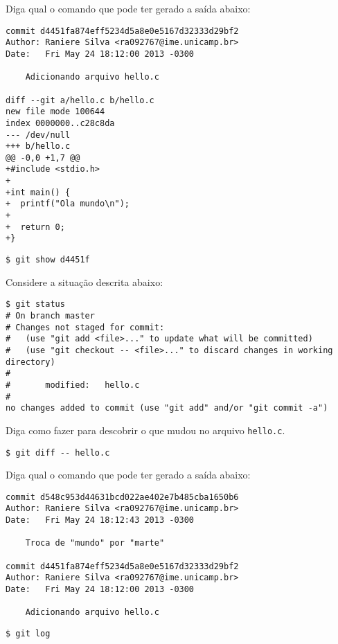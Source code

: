 \begin{Exercise}[label={0011}, difficulty={0}, origin={git}]
  Diga qual o comando que pode ter gerado a saída abaixo:
  \begin{lstlisting}
commit d4451fa874eff5234d5a8e0e5167d32333d29bf2
Author: Raniere Silva <ra092767@ime.unicamp.br>
Date:   Fri May 24 18:12:00 2013 -0300

    Adicionando arquivo hello.c

diff --git a/hello.c b/hello.c
new file mode 100644
index 0000000..c28c8da
--- /dev/null
+++ b/hello.c
@@ -0,0 +1,7 @@
+#include <stdio.h>
+
+int main() {
+  printf("Ola mundo\n");
+
+  return 0;
+}
  \end{lstlisting}
\end{Exercise}
\begin{Answer}[ref={0011}]
  \begin{lstlisting}
$ git show d4451f 
  \end{lstlisting}
\end{Answer}

\begin{Exercise}[label={0012}, difficulty={0}, origin={git}]
  Considere a situação descrita abaixo:
  \begin{lstlisting}
$ git status
# On branch master
# Changes not staged for commit:
#   (use "git add <file>..." to update what will be committed)
#   (use "git checkout -- <file>..." to discard changes in working directory)
#
#       modified:   hello.c
#
no changes added to commit (use "git add" and/or "git commit -a")
  \end{lstlisting}
  Diga como fazer para descobrir o que mudou no arquivo \lstinline+hello.c+.
\end{Exercise}
\begin{Answer}[ref={0012}]
  \begin{lstlisting}
$ git diff -- hello.c
  \end{lstlisting}
\end{Answer}

\begin{Exercise}[label={0013}, difficulty={0}, origin={git}]
  Diga qual o comando que pode ter gerado a saída abaixo:
  \begin{lstlisting}
commit d548c953d44631bcd022ae402e7b485cba1650b6
Author: Raniere Silva <ra092767@ime.unicamp.br>
Date:   Fri May 24 18:12:43 2013 -0300

    Troca de "mundo" por "marte"

commit d4451fa874eff5234d5a8e0e5167d32333d29bf2
Author: Raniere Silva <ra092767@ime.unicamp.br>
Date:   Fri May 24 18:12:00 2013 -0300

    Adicionando arquivo hello.c
  \end{lstlisting}
\end{Exercise}
\begin{Answer}[ref={0013}]
  \begin{lstlisting}
$ git log
  \end{lstlisting}
\end{Answer}

